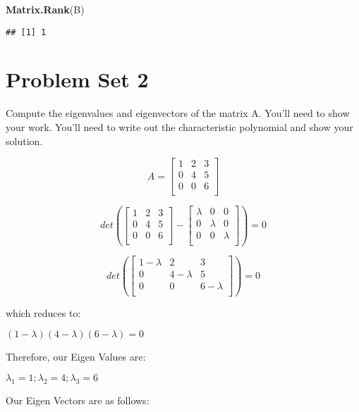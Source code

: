 \documentclass[]{article}
\newenvironment{Shaded}{\begin{snugshade}}{\end{snugshade}}
\newcommand{\KeywordTok}[1]{\textcolor[rgb]{0.13,0.29,0.53}{\textbf{{#1}}}}
\newcommand{\NormalTok}[1]{{#1}}
\begin{document}
\begin{Shaded}
\begin{Highlighting}[]
\KeywordTok{Matrix.Rank}\NormalTok{(B)}
\end{Highlighting}
\end{Shaded}

\begin{verbatim}
## [1] 1
\end{verbatim}

\section{Problem Set 2}\label{problem-set-2}

Compute the eigenvalues and eigenvectors of the matrix A. You'll need to
show your work. You'll need to write out the characteristic polynomial
and show your solution.

\[
A = 
\begin{bmatrix}
   1 & 2 & 3 \\
   0 & 4 & 5 \\
   0 & 0 & 6 \\
\end{bmatrix}
\]

\[
det( 
\begin{bmatrix}
   1 & 2 & 3 \\
   0 & 4 & 5 \\
   0 & 0 & 6 \\
\end{bmatrix}
-
\begin{bmatrix}
   \lambda & 0 & 0 \\
   0 & \lambda  & 0 \\
   0 & 0 & \lambda  \\
\end{bmatrix}
) = 0
\]

\[
det( 
\begin{bmatrix}
   1 -\lambda  & 2 & 3 \\
   0 &  4 -\lambda& 5 \\
   0 & 0 & 6 -\lambda \\
\end{bmatrix}
)=0
\]

which reduces to:

\((1-\lambda)(4-\lambda)(6-\lambda) =0\)

Therefore, our Eigen Values are:

\(\lambda_1 = 1 ; \lambda_2 = 4; \lambda_3 = 6\)

Our Eigen Vectors are as follows:
\end{document}
